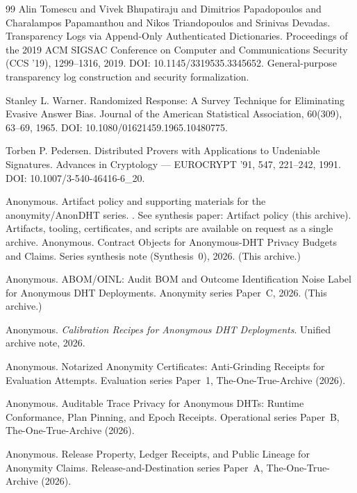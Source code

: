 \documentclass[11pt]{article}
\begin{document}
\begin{thebibliography}{99}
Alin Tomescu and Vivek Bhupatiraju and Dimitrios Papadopoulos and Charalampos Papamanthou and Nikos Triandopoulos and Srinivas Devadas.
\newblock Transparency Logs via Append-Only Authenticated Dictionaries.
\newblock Proceedings of the 2019 {ACM} SIGSAC Conference on Computer and Communications Security (CCS '19), 1299--1316, 2019.
\newblock DOI: 10.1145/3319535.3345652.
\newblock General-purpose transparency log construction and security formalization.

Stanley L. Warner.
\newblock Randomized Response: A Survey Technique for Eliminating Evasive Answer Bias.
\newblock Journal of the American Statistical Association, 60(309), 63--69, 1965.
\newblock DOI: 10.1080/01621459.1965.10480775.

Torben P. Pedersen.
\newblock Distributed Provers with Applications to Undeniable Signatures.
\newblock Advances in Cryptology --- {EUROCRYPT} '91, 547, 221--242, 1991.
\newblock DOI: 10.1007/3-540-46416-6\_20.

Anonymous.
\newblock Artifact policy and supporting materials for the anonymity/AnonDHT series.
.
\newblock See synthesis paper: Artifact policy (this archive). Artifacts, tooling, certificates, and scripts are available on request as a single archive.
Anonymous.
\newblock Contract Objects for Anonymous-DHT Privacy Budgets and Claims.
\newblock Series synthesis note (Synthesis~0), 2026. (This archive.)

Anonymous.
\newblock ABOM/OINL: Audit BOM and Outcome Identification Noise Label for Anonymous DHT Deployments.
\newblock Anonymity series Paper~C, 2026. (This archive.)

Anonymous.
\newblock \emph{Calibration Recipes for Anonymous DHT Deployments}.
\newblock Unified archive note, 2026.

Anonymous.
\newblock Notarized Anonymity Certificates: Anti-Grinding Receipts for Evaluation Attempts.
\newblock Evaluation series Paper~1, The-One-True-Archive (2026).

Anonymous.
\newblock Auditable Trace Privacy for Anonymous DHTs: Runtime Conformance, Plan Pinning, and Epoch Receipts.
\newblock Operational series Paper~B, The-One-True-Archive (2026).

Anonymous.
\newblock Release Property, Ledger Receipts, and Public Lineage for Anonymity Claims.
\newblock Release-and-Destination series Paper~A, The-One-True-Archive (2026).


\end{thebibliography}
\end{document}
